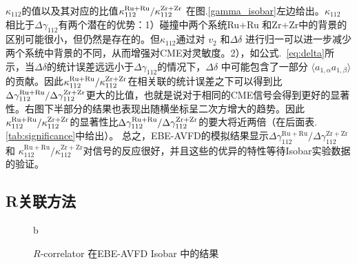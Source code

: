 $\kappa_{112}$的值以及其对应的比值$\kappa_{112}^{\rm Ru+Ru}/\kappa_{112}^{\rm Zr+Zr}$ 在图.\ref{gamma_isobar}左边给出。$\kappa_{112}$ 相比于$\Delta\gamma_{112}$有两个潜在的优势：1）碰撞中两个系统Ru+Ru 和Zr+Zr中的背景的区别可能很小，但仍然是存在的。但$\kappa_{112}$通过对 $v_2$ 和$\Delta\delta$ 进行归一可以进一步减少两个系统中背景的不同，从而增强对CME对灵敏度。2），如公式.~\ref{eq:delta}所示，当$\Delta\delta$的统计误差远远小于$\Delta\gamma_{112}$的情况下，$\Delta\delta$ 中可能包含了一部分 $\langle a_{1,\alpha}a_{1,\beta}\rangle$ 的贡献。因此$\kappa_{112}^{\rm Ru+Ru}/\kappa_{112}^{\rm Zr+Zr}$在相关联的统计误差之下可以得到比 $\Delta\gamma_{112}^{\rm Ru+Ru}/\Delta\gamma_{112}^{\rm Zr+Zr}$更大的比值，也就是说对于相同的CME信号会得到更好的显著性。右图下半部分的结果也表现出随横坐标呈二次方增大的趋势。因此$\kappa_{112}^{\rm Ru+Ru}/\kappa_{112}^{\rm Zr+Zr}$的显著性比$\Delta\gamma_{112}^{\rm Ru+Ru}/\Delta\gamma_{112}^{\rm Zr+Zr}$的要大将近两倍（在后面表.\ref{tab:significance}中给出）。
总之，EBE-AVFD的模拟结果显示$\Delta\gamma_{112}^\mathrm{Ru+Ru} / \Delta\gamma_{112}^\mathrm{Zr+Zr}$ 和 $\kappa_{112}^\mathrm{Ru+Ru} / \kappa_{112}^\mathrm{Zr+Zr}$对信号的反应很好，并且这些的优异的特性等待Isobar实验数据的验证。


\subsection{R关联方法}
\begin{figure}{b}
\hspace{-1.2cm}
\centering
\caption[$R$-correlator 在EBE-AVFD Isobar 中的结果]{$R$-correlator 在EBE-AVFD Isobar 中的结果
}
\hspace{1.43cm}\label{fig:R_isobar}
\end{figure}


